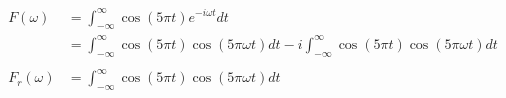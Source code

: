 \documentclass[preview]{standalone}
\begin{document}
\begin{align*}
F(\omega)&= \int_{-\infty}^{\infty} \cos{(5\pi t)}e^{-i\omega t} dt \\ &=\int_{-\infty}^{\infty} \cos{(5\pi t)}\cos{(5\pi\omega t)} dt - i\int_{-\infty}^{\infty} \cos{(5\pi t)}\cos{(5\pi\omega t)} dt \\ \\ F_{r}(\omega)&=\int_{-\infty}^{\infty} \cos{(5\pi t)}\cos{(5\pi\omega t)} dt
\end{align*}
\end{document}
